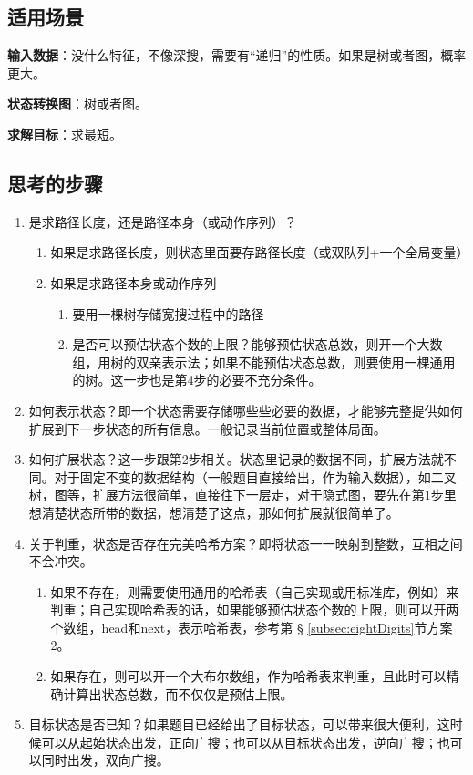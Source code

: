 \subsection{适用场景}

\textbf{输入数据}：没什么特征，不像深搜，需要有“递归”的性质。如果是树或者图，概率更大。

\textbf{状态转换图}：树或者图。

\textbf{求解目标}：求最短。


\subsection{思考的步骤}
\begin{enumerate}
	\item 是求路径长度，还是路径本身（或动作序列）？
	\begin{enumerate}
		\item 如果是求路径长度，则状态里面要存路径长度（或双队列+一个全局变量）
		\item 如果是求路径本身或动作序列
		\begin{enumerate}
			\item 要用一棵树存储宽搜过程中的路径
			\item 是否可以预估状态个数的上限？能够预估状态总数，则开一个大数组，用树的双亲表示法；如果不能预估状态总数，则要使用一棵通用的树。这一步也是第4步的必要不充分条件。
		\end{enumerate}
	\end{enumerate}
	
	\item 如何表示状态？即一个状态需要存储哪些些必要的数据，才能够完整提供如何扩展到下一步状态的所有信息。一般记录当前位置或整体局面。
	
	\item 
	如何扩展状态？这一步跟第2步相关。状态里记录的数据不同，扩展方法就不同。对于固定不变的数据结构（一般题目直接给出，作为输入数据），如二叉树，图等，扩展方法很简单，直接往下一层走，对于隐式图，要先在第1步里想清楚状态所带的数据，想清楚了这点，那如何扩展就很简单了。
	
	\item 关于判重，状态是否存在完美哈希方案？即将状态一一映射到整数，互相之间不会冲突。
	\begin{enumerate}
		\item 如果不存在，则需要使用通用的哈希表（自己实现或用标准库，例如）来判重；自己实现哈希表的话，如果能够预估状态个数的上限，则可以开两个数组，head和next，表示哈希表，参考第 \S 
		\ref{subsec:eightDigits}节方案2。
		\item 如果存在，则可以开一个大布尔数组，作为哈希表来判重，且此时可以精确计算出状态总数，而不仅仅是预估上限。
	\end{enumerate}
	
	\item 目标状态是否已知？如果题目已经给出了目标状态，可以带来很大便利，这时候可以从起始状态出发，正向广搜；也可以从目标状态出发，逆向广搜；也可以同时出发，双向广搜。
\end{enumerate}


